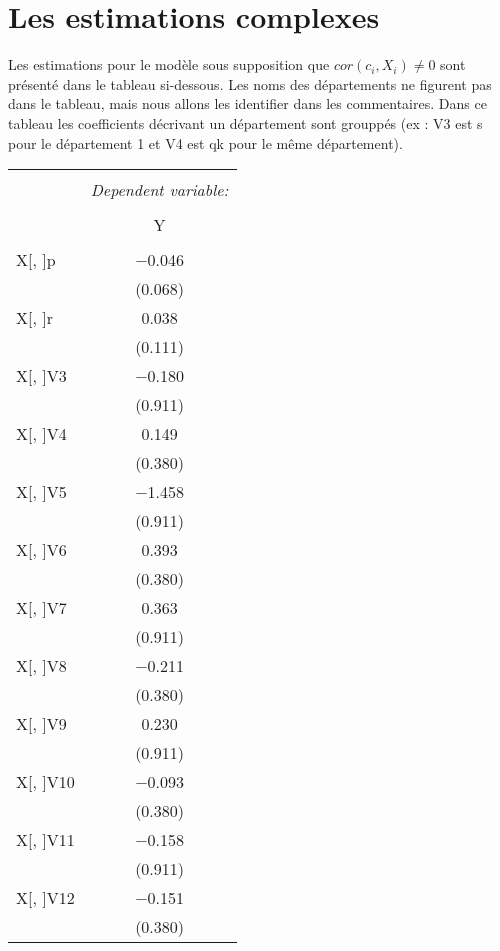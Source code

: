 \documentclass[11pt, a4paper]{article}
\begin{document}
\section*{Les estimations complexes}
Les estimations pour le modèle sous supposition que $cor(c_i, X_i) \neq 0$ sont présenté dans le tableau si-dessous. 
Les noms des départements ne figurent pas dans le tableau, mais nous allons les identifier dans les commentaires. 
Dans ce tableau les coefficients décrivant un département sont grouppés (ex : V3 est s pour le département 1 et V4 est qk pour le même département).
\begin{multicols}{2}
\FloatBarrier
\begin{center}
\begin{tabular}{@{\extracolsep{5pt}}lc} 
\\[-1.8ex]\hline 
\hline \\[-1.8ex] 
 & \multicolumn{1}{c}{\textit{Dependent variable:}} \\ 
\cline{2-2} 
\\[-1.8ex] & Y \\ 
\hline \\[-1.8ex] 
 X[, ]p & $-$0.046 \\ 
  & (0.068) \\  
 X[, ]r & 0.038 \\ 
  & (0.111) \\  
 X[, ]V3 & $-$0.180 \\ 
  & (0.911) \\  
 X[, ]V4 & 0.149 \\ 
  & (0.380) \\  
 X[, ]V5 & $-$1.458 \\ 
  & (0.911) \\  
 X[, ]V6 & 0.393 \\ 
  & (0.380) \\  
 X[, ]V7 & 0.363 \\ 
  & (0.911) \\  
 X[, ]V8 & $-$0.211 \\ 
  & (0.380) \\  
 X[, ]V9 & 0.230 \\ 
  & (0.911) \\ 
 X[, ]V10 & $-$0.093 \\ 
  & (0.380) \\  
 X[, ]V11 & $-$0.158 \\ 
  & (0.911) \\ 
 X[, ]V12 & $-$0.151 \\ 
  & (0.380) \\ 

\end{tabular}
\end{center}
\end{multicols}
\end{document}
